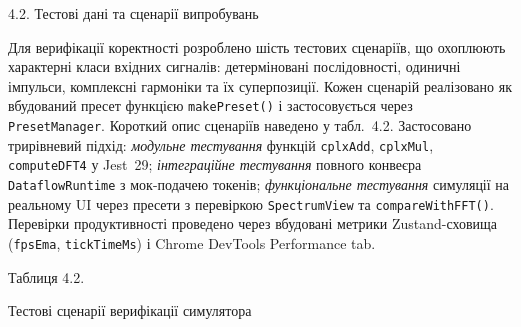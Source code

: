 \protect{}\label{_Toc229681166}{}4.2. Тестові дані та
сценарії випробувань

Для верифікації коректності розроблено шість тестових сценаріїв, що
охоплюють характерні класи вхідних сигналів: детерміновані
послідовності, одиничні імпульси, комплексні гармоніки та їх
суперпозиції. Кожен сценарій реалізовано як вбудований пресет функцією
\texttt{makePreset()} і застосовується через \texttt{PresetManager}.
Короткий опис сценаріїв наведено у табл.~4.2. Застосовано трирівневий
підхід: \emph{модульне тестування} функцій \texttt{cplxAdd},
\texttt{cplxMul}, \texttt{computeDFT4} у Jest~29; \emph{інтеграційне
тестування} повного конвеєра \texttt{DataflowRuntime} з мок-подачею
токенів; \emph{функціональне тестування} симуляції на реальному UI через
пресети з перевіркою \texttt{SpectrumView} та \texttt{compareWithFFT()}.
Перевірки продуктивності проведено через вбудовані метрики
Zustand-сховища (\texttt{fpsEma}, \texttt{tickTimeMs}) і Chrome DevTools
Performance tab.

Таблиця 4.2.

Тестові сценарії верифікації симулятора

